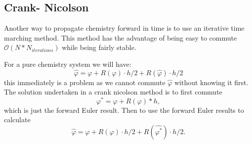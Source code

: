\documentclass[]{article}
\begin{document}
\subsection{Crank- Nicolson}
Another way to propagate chemistry forward in time is to use an iterative time marching method. This method has the advantage of being easy to commute $\mathcal{O}(N*N_{iterations})$ while being fairly stable.
	
For a pure chemistry system we will have:
\begin{equation}
\hat{\varphi} = \varphi + R(\varphi)\cdot h/2 +R(\hat{\varphi})\cdot h/2
\end{equation}
this immediately is a problem as we cannot commute $\hat{\varphi}$ without knowing it first. The solution undertaken in a crank nicolson method is to first commute
\begin{equation}
\varphi^* = \varphi + R(\varphi)*h, 
\end{equation}
which is just the forward Euler result. Then to use the forward Euler results to calculate
\begin{equation}
\hat{\varphi} = \varphi + R(\varphi)\cdot h/2 +R(\hat{\varphi^*})\cdot h/2.
\end{equation}
\end{document}

